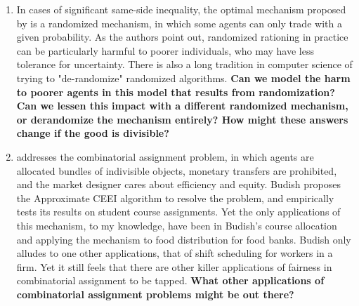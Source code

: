 \documentclass[JEL]{AEA}
\begin{document}
\begin{enumerate}
    \item In cases of significant same-side inequality, the optimal mechanism proposed by \cite{dworczak-2020} is a randomized mechanism, in which some agents can only trade with a given probability. As the authors point out, randomized rationing in practice can be particularly harmful to poorer individuals, who may have less tolerance for uncertainty. There is also a long tradition in computer science of trying to "de-randomize" randomized algorithms. \textbf{Can we model the harm to poorer agents in this model that results from randomization? Can we lessen this impact with a different randomized mechanism, or derandomize the mechanism entirely? How might these answers change if the good is divisible?}
    
    \item \cite{budish-2011} addresses the combinatorial assignment problem, in which agents are allocated bundles of indivisible objects, monetary transfers are prohibited, and the market designer cares about efficiency and equity. Budish proposes the Approximate CEEI algorithm to resolve the problem, and empirically tests its results on student course assignments. Yet the only applications of this mechanism, to my knowledge, have been in Budish's course allocation and \cite{prendergast-2017} applying the mechanism to food distribution for food banks. Budish only alludes to one other applications, that of shift scheduling for workers in a firm. Yet it still feels that there are other killer applications of fairness in combinatorial assignment to be tapped. \textbf{What other applications of combinatorial assignment problems might be out there?}
    
\end{enumerate}




\end{document}
